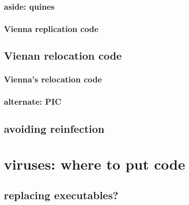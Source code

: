 \subsubsection{aside: quines}



\subsubsection{Vienna replication code}



\subsection{Vienan relocation code}

\subsubsection{Vienna's relocation code}


\subsubsection{alternate: PIC}


\subsection{avoiding reinfection}




\section{viruses: where to put code}



\subsection{replacing executables?}

